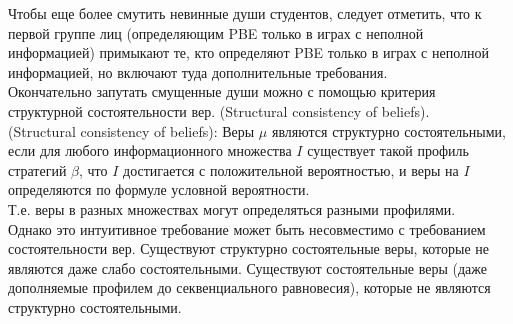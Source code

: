\documentclass[pdftex,12pt,a4paper]{article}
\begin{document}
Чтобы еще более смутить невинные души студентов, следует отметить,
что к первой группе лиц (определяющим PBE только в играх с
неполной информацией) примыкают те, кто определяют PBE только в
играх с неполной информацией, но включают туда дополнительные
требования. \\

Окончательно запутать смущенные души можно с помощью критерия
структурной состоятельности вер. (Structural consistency of beliefs). \\

(Structural consistency of beliefs): Веры $\mu$ являются
структурно состоятельными, если для любого информационного
множества $I$ существует такой профиль стратегий $\beta$, что $I$
достигается с положительной вероятностью, и веры на $I$
определяются по формуле условной вероятности. \\

Т.е. веры в разных множествах могут определяться разными
профилями. \\

Однако это интуитивное требование  может быть несовместимо с
требованием состоятельности вер. Существуют структурно
состоятельные веры, которые не являются даже слабо состоятельными.
Существуют состоятельные веры (даже дополняемые профилем до
секвенциального равновесия), которые не являются структурно
состоятельными. \\
\end{document}
